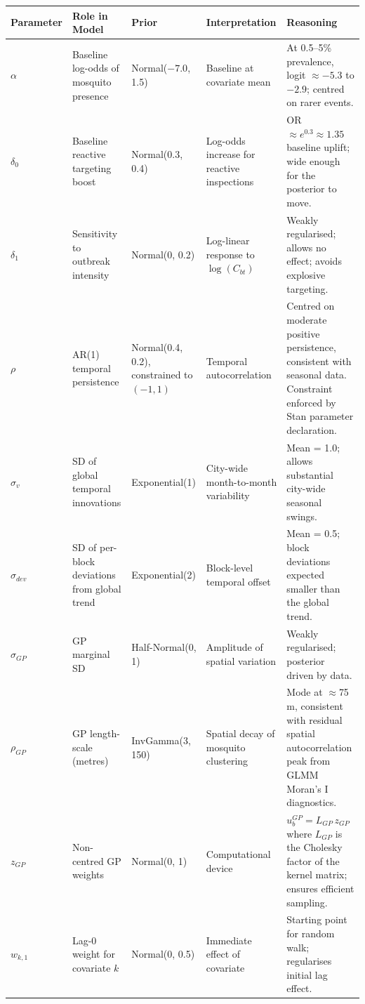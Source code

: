 \documentclass[12pt,a4paper]{article}
\begin{document}
\begin{table}[ht]
\centering
\small
\begin{tabular}{p{2.0cm}p{3.0cm}p{3.0cm}p{3.0cm}p{4.5cm}}
\toprule
Parameter & Role in Model & Prior & Interpretation & Reasoning \\
\midrule
\textbf{$\alpha$} & Baseline log-odds of mosquito presence & Normal($-7.0$, 1.5) & Baseline at covariate mean & At 0.5--5\% prevalence, logit $\approx -5.3$ to $-2.9$; centred on rarer events. \\
\addlinespace
\textbf{$\delta_0$} & Baseline reactive targeting boost & Normal(0.3, 0.4) & Log-odds increase for reactive inspections & OR $\approx e^{0.3} \approx 1.35$ baseline uplift; wide enough for the posterior to move. \\
\addlinespace
\textbf{$\delta_1$} & Sensitivity to outbreak intensity & Normal(0, 0.2) & Log-linear response to $\log(C_{bt})$ & Weakly regularised; allows no effect; avoids explosive targeting. \\
\addlinespace
\textbf{$\rho$} & AR(1) temporal persistence & Normal(0.4, 0.2), constrained to $(-1,1)$ & Temporal autocorrelation & Centred on moderate positive persistence, consistent with seasonal data. Constraint enforced by Stan parameter declaration. \\
\addlinespace
\textbf{$\sigma_v$} & SD of global temporal innovations & Exponential(1) & City-wide month-to-month variability & Mean = 1.0; allows substantial city-wide seasonal swings. \\
\addlinespace
\textbf{$\sigma_{dev}$} & SD of per-block deviations from global trend & Exponential(2) & Block-level temporal offset & Mean = 0.5; block deviations expected smaller than the global trend. \\
\addlinespace
\textbf{$\sigma_{GP}$} & GP marginal SD & Half-Normal(0, 1) & Amplitude of spatial variation & Weakly regularised; posterior driven by data. \\
\addlinespace
\textbf{$\rho_{GP}$} & GP length-scale (metres) & InvGamma(3, 150) & Spatial decay of mosquito clustering & Mode at $\approx$75\,m, consistent with residual spatial autocorrelation peak from GLMM Moran's I diagnostics. \\
\addlinespace
\textbf{$z_{GP}$} & Non-centred GP weights & Normal(0, 1) & Computational device & $u_b^{GP} = L_{GP}\, z_{GP}$ where $L_{GP}$ is the Cholesky factor of the kernel matrix; ensures efficient sampling. \\
\addlinespace
\textbf{$w_{k,1}$} & Lag-0 weight for covariate $k$ & Normal(0, 0.5) & Immediate effect of covariate & Starting point for random walk; regularises initial lag effect. \\

\end{tabular}
\end{table}
\end{document}
